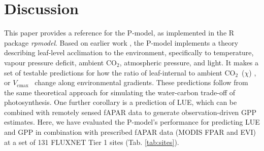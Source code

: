 \documentclass{myreport}
\newcommand{\coo}{CO$_2$}
\newcommand{\vcmax}{$V_{\text{cmax}}$}
\begin{document}

\section{Discussion}
\label{sec:discussion}

This paper provides a reference for the P-model, as implemented in the R package \textit{rpmodel}. Based on earlier work \citep{wright03, prentice14ecollett, wang17natpl}, the P-model implements a theory describing leaf-level acclimation to the environment, specifically to temperature, vapour pressure deficit, ambient \coo , atmospheric pressure, and light. It makes a set of testable predictions for how the ratio of leaf-internal to ambient \coo\ ($\chi$) \citep{wang17natpl}, or \vcmax\ \citep{smith19ecollett} change along environmental gradients. These predictions follow from the same theoretical approach for simulating the water-carbon trade-off of photosynthesis. One further corollary is a prediction of LUE, which can be combined with remotely sensed fAPAR data to generate observation-driven GPP estimates. Here, we have evaluated the P-model's performance for predicting LUE and GPP in combination with prescribed fAPAR data (MODIS FPAR and EVI) at a set of 131 FLUXNET Tier 1 sites (Tab. \ref{tab:sites}).
\end{document}
